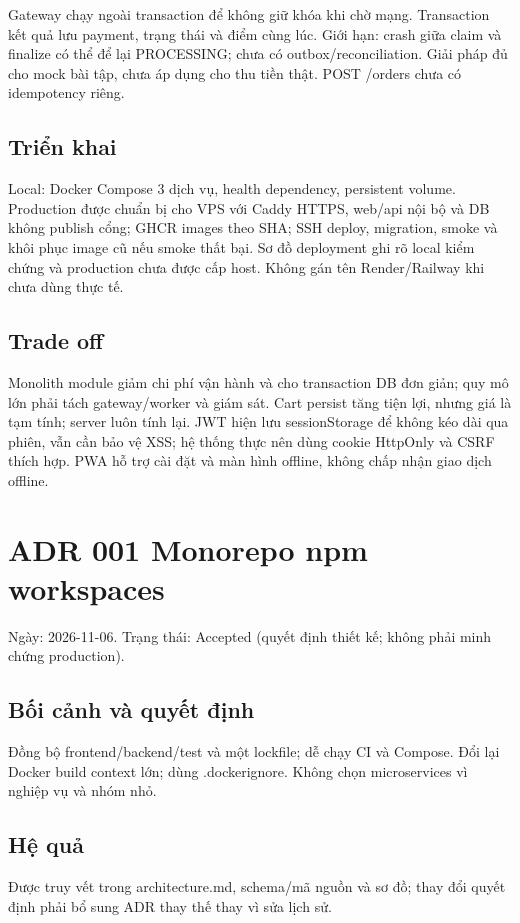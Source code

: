 \documentclass[a4paper,12pt,oneside]{report}
\begin{document}
Gateway chạy ngoài transaction để không giữ khóa khi chờ mạng. Transaction kết quả lưu payment, trạng thái và điểm cùng lúc. Giới hạn: crash giữa claim và finalize có thể để lại PROCESSING; chưa có outbox/\allowbreak{}reconciliation. Giải pháp đủ cho mock bài tập, chưa áp dụng cho thu tiền thật. POST /\allowbreak{}orders chưa có idempotency riêng.


\subsection{Triển khai}
Local: Docker Compose 3 dịch vụ, health dependency, persistent volume. Production được chuẩn bị cho VPS với Caddy HTTPS, web/\allowbreak{}api nội bộ và DB không publish cổng; GHCR images theo SHA; SSH deploy, migration, smoke và khôi phục image cũ nếu smoke thất bại. Sơ đồ deployment ghi rõ local kiểm chứng và production chưa được cấp host. Không gán tên Render/\allowbreak{}Railway khi chưa dùng thực tế.


\subsection{Trade off}
Monolith module giảm chi phí vận hành và cho transaction DB đơn giản; quy mô lớn phải tách gateway/\allowbreak{}worker và giám sát. Cart persist tăng tiện lợi, nhưng giá là tạm tính; server luôn tính lại. JWT hiện lưu sessionStorage để không kéo dài qua phiên, vẫn cần bảo vệ XSS; hệ thống thực nên dùng cookie HttpOnly và CSRF thích hợp. PWA hỗ trợ cài đặt và màn hình offline, không chấp nhận giao dịch offline.


\section{ADR 001 Monorepo npm workspaces}

Ngày: 2026-11-06. Trạng thái: Accepted (quyết định thiết kế; không phải minh chứng production).


\subsection{Bối cảnh và quyết định}
Đồng bộ frontend/\allowbreak{}backend/\allowbreak{}test và một lockfile; dễ chạy CI và Compose. Đổi lại Docker build context lớn; dùng .dockerignore. Không chọn microservices vì nghiệp vụ và nhóm nhỏ.


\subsection{Hệ quả}
Được truy vết trong architecture.md, schema/\allowbreak{}mã nguồn và sơ đồ; thay đổi quyết định phải bổ sung ADR thay thế thay vì sửa lịch sử.
\end{document}
